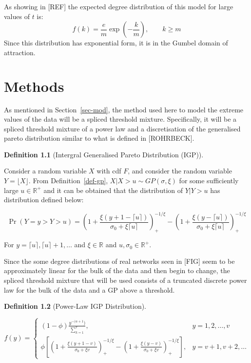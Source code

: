 \documentclass[
  10pt,
  a4paper,
]{scrreprt}
\theoremstyle{definition}
\newtheorem{definition}{Definition}[section]
\theoremstyle{plain}
\theoremstyle{remark}
\begin{document}
{As showing in {[}REF{]} the expected degree distribution of this model
for large values of \(t\) is: \[
f(k) = \displaystyle\frac{e}{m}\exp\left(-\displaystyle\frac{k}{m}\right),\qquad k \ge m
\] Since this distribution has exponential form, it is in the Gumbel
domain of attraction.

\hypertarget{sec-meth}{%
\chapter{Methods}\label{sec-meth}}

As mentioned in Section~\ref{sec-mod}, the method used here to model the
extreme values of the data will be a spliced threshold mixture.
Specifically, it will be a spliced threshold mixture of a power law and
a discretisation of the generalised pareto distribution similar to what
is defined in {[}ROHRBECK{]}.

\begin{definition}[Intergral Generalised Pareto Distribution
(IGP)]\protect\hypertarget{def-igp}{}\label{def-igp}

Consider a random variable \(X\) with cdf \(F\), and consider the random
variable \(Y=\lfloor X \rfloor\). From Definition~\ref{def-gp},
\(X|X>u \sim GP(\sigma, \xi)\) for some sufficiently large
\(u\in \mathbb R^+\) and it can be obtained that the distribution of
\(Y|Y>u\) has distribution defined below:

\[
\Pr(Y=y>Y>u) = \left(1+\displaystyle\frac{\xi(y+1-\lceil u\rceil)}{\sigma_0+\xi\lceil u\rceil}\right)_+^{-1/\xi}-\left(1+\displaystyle\frac{\xi(y-\lceil u\rceil)}{\sigma_0+\xi\lceil u\rceil}\right)_+^{-1/\xi}
\]

For \(y=\lceil u\rceil,\lceil u\rceil+1, \ldots\) and
\(\xi \in \mathbb R\) and \(u, \sigma_0 \in \mathbb R^+.\)

\end{definition}

Since the some degree distributions of real networks seen in {[}FIG{]}
seem to be approximately linear for the bulk of the data and then begin
to change, the spliced threshold mixture that will be used consists of a
truncated discrete power law for the bulk of the data and a GP above a
threshold.

\begin{definition}[Power-Law IGP
Distribution]\protect\hypertarget{def-pligp}{}\label{def-pligp}

\[
f(y) = \begin{cases}
(1-\phi)\displaystyle\frac{y^{-(\alpha+1})}{\sum_{k=1}^v}, & y=1,2,\ldots, v\\
\phi\left[\left(1+\displaystyle\frac{\xi(y+1-v)}{\sigma_0+\xi v}\right)_+^{-1/\xi}-\left(1+\displaystyle\frac{\xi(y-v)}{\sigma_0+\xi v}\right)_+^{-1/\xi}\right],&y=v+1, v+2,\ldots
\end{cases}
\]


\end{definition}}
\end{document}
